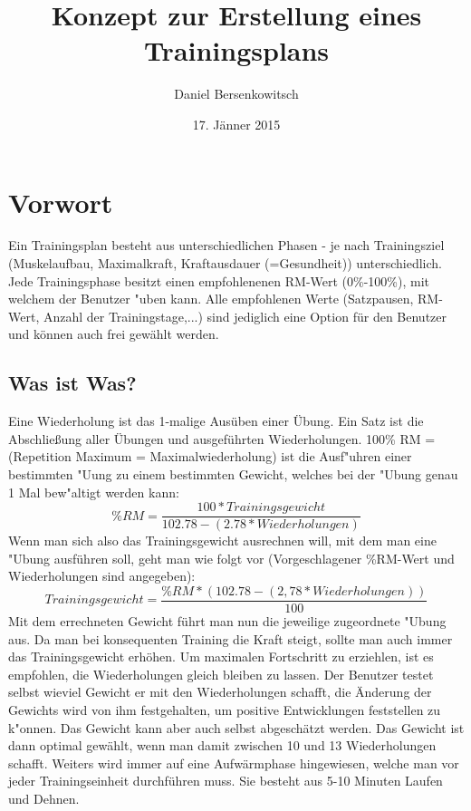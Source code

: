 \documentclass[a4paper,12pt]{article}
\title{Konzept zur Erstellung eines Trainingsplans}
\author{Daniel Bersenkowitsch}
\date{17. Jänner 2015}
\begin{document}
	\maketitle
	\newpage
	\tableofcontents
	\newpage

	\section{Vorwort}
	Ein Trainingsplan besteht aus unterschiedlichen Phasen - je nach Trainingsziel (Muskelaufbau, Maximalkraft, Kraftausdauer (=Gesundheit)) unterschiedlich. Jede Trainingsphase besitzt einen empfohlenenen RM-Wert (0\%-100\%), mit welchem der Benutzer "uben kann. Alle empfohlenen Werte (Satzpausen, RM-Wert, Anzahl der Trainingstage,...) sind jediglich eine Option für den Benutzer und können auch frei gewählt werden.
	\subsection{Was ist Was?}
	Eine \grqq{}Wiederholung\grqq{} ist das 1-malige Ausüben einer Übung. 
	\newline
	Ein \grqq{}Satz\grqq{} ist die Abschließung aller Übungen und ausgeführten Wiederholungen.
	100\% RM =(Repetition Maximum = Maximalwiederholung) ist die Ausf"uhren einer bestimmten "Uung zu einem bestimmten Gewicht, welches bei der "Ubung genau 1 Mal bew"altigt werden kann:
	\[\%RM=\frac{100*Trainingsgewicht}{102.78-(2.78*Wiederholungen)}\]
	Wenn man sich also das Trainingsgewicht ausrechnen will, mit dem man eine "Ubung ausführen soll, geht man wie folgt vor (Vorgeschlagener \%RM-Wert und Wiederholungen sind angegeben):
	\[Trainingsgewicht=\frac{\%RM*(102.78-(2,78*Wiederholungen))}{100}\]
	Mit dem errechneten Gewicht führt man nun die jeweilige zugeordnete "Ubung aus. Da man bei konsequenten Training die Kraft steigt, sollte man auch immer das Trainingsgewicht erhöhen. Um maximalen Fortschritt zu erziehlen, ist es empfohlen, die Wiederholungen gleich bleiben zu lassen. Der Benutzer testet selbst wieviel Gewicht er mit den Wiederholungen schafft, die Änderung der Gewichts wird von ihm festgehalten, um positive Entwicklungen feststellen zu k"onnen. 
	\newline
	Das Gewicht kann aber auch selbst abgeschätzt werden. Das Gewicht ist dann optimal gewählt, wenn man damit zwischen 10 und 13 Wiederholungen schafft.
	Weiters wird immer auf eine Aufwärmphase hingewiesen, welche man vor jeder Trainingseinheit durchführen muss. Sie besteht aus 5-10 Minuten Laufen und Dehnen.
	\newpage
\end{document}
